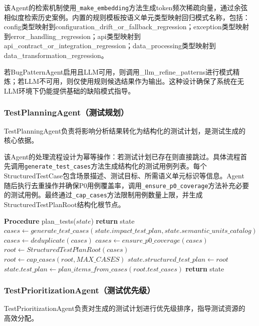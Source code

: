 该Agent的检索机制使用\texttt{\_make\_embedding}方法生成token频次稀疏向量，通过余弦相似度检索历史案例。内置的规则模板按语义单元类型映射回归模式名称，包括：config类型映射到configuration\_drift\_or\_fallback\_regression；exception类型映射到error\_handling\_regression；api类型映射到api\_contract\_or\_integration\_regression；data\_processing类型映射到data\_transformation\_regression。

若BugPatternAgent启用且LLM可用，则调用\_llm\_refine\_patterns进行模式精炼；若LLM不可用，则仅使用规则候选结果作为输出。这种设计确保了系统在无LLM环境下仍能提供基础的缺陷模式指导。
\subsubsection{TestPlanningAgent（测试规划）}
TestPlanningAgent负责将影响分析结果转化为结构化的测试计划，是测试生成的核心依据。

该Agent的处理流程设计为幂等操作：若测试计划已存在则直接跳过。具体流程首先调用\texttt{generate\_test\_cases}方法生成结构化的测试用例列表。每个StructuredTestCase包含场景描述、测试目标、所需语义单元标识等信息。Agent随后执行去重操作并确保P0用例覆盖率，调用\texttt{\_ensure\_p0\_coverage}方法补充必要的测试用例。最终通过\texttt{\_cap\_cases}方法限制用例数量上限，并生成StructuredTestPlanRoot结构化根节点。

\begin{algorithm}[htbp]
\caption{TestPlanningAgent测试规划生成（抽象示意）}
\label{alg:test-planning}
\begin{algorithmic}[1]
\STATE \textbf{Procedure} plan\_tests($state$)
\STATE \textbf{return} state
\ENDIF
\STATE $cases \leftarrow generate\_test\_cases(state.impact\_test\_plan, state.semantic\_units\_catalog)$
\STATE $cases \leftarrow deduplicate(cases)$
\STATE $cases \leftarrow ensure\_p0\_coverage(cases)$
\STATE $root \leftarrow StructuredTestPlanRoot(cases)$
\STATE $root \leftarrow cap\_cases(root, MAX\_CASES)$
\STATE $state.structured\_test\_plan \leftarrow root$
\STATE $state.test\_plan \leftarrow plan\_items\_from\_cases(root.test\_cases)$
\STATE \textbf{return} state
\end{algorithmic}
\end{algorithm}
\subsubsection{TestPrioritizationAgent（测试优先级）}
TestPrioritizationAgent负责对生成的测试计划进行优先级排序，指导测试资源的高效分配。

